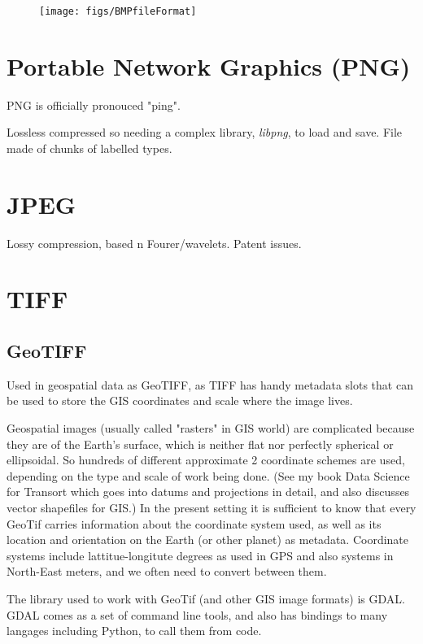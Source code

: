 \documentclass[oneside,english]{scrbook}
\begin{document}
\begin{figure}
	\caption{}
	\texttt{[image: figs/BMPfileFormat]}
\end{figure}



\section{Portable Network Graphics (PNG)}

PNG is officially pronouced "ping".

Lossless compressed so needing a complex library, {\em libpng}, to load and save.  File made of chunks of labelled types.


\section{JPEG}

Lossy compression, based n Fourer/wavelets. Patent issues.

\section{TIFF}

\subsection{GeoTIFF}

Used in geospatial data as GeoTIFF, as TIFF has handy metadata slots that can be used to store the GIS coordinates and scale where the image lives.

Geospatial images (usually called "rasters" in GIS world) are complicated because they are of the Earth's surface, which is neither flat nor perfectly spherical or ellipsoidal.    So hundreds of different approximate 2 coordinate schemes are used, depending on the type and scale of work being done.    (See my book Data Science for Transort which goes into datums and projections in detail, and also discusses vector shapefiles for GIS.) In the present setting it is sufficient to know that every GeoTif carries information about the coordinate system used, as well as its location and orientation on the Earth (or other planet) as metadata.  Coordinate systems include lattitue-longitute degrees as used in GPS and also systems in North-East meters, and we often need to convert between them.

The library used to work with GeoTif (and other GIS image formats) is GDAL. GDAL comes as a set of command line tools, and also has bindings to many langages including Python, to call them from code.
\end{document}

